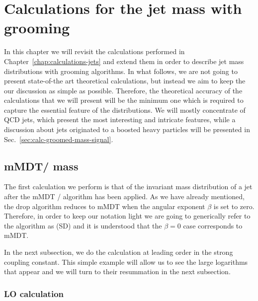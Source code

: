 %

\chapter{Calculations for the jet mass with grooming}\label{calculations-substructure-mass}

In this chapter we will revisit the calculations performed in Chapter~\ref{chap:calculations-jets} and extend them 
in order to describe jet mass distributions with grooming algorithms. 
%
In what follows, we are not going to present state-of-the art theoretical calculations, but instead we aim to keep the 
our discussion as simple as possible. Therefore, the theoretical accuracy of the calculations that we will present will be the minimum one which is required to capture the essential feature of the distributions. 
%
We will mostly concentrate of QCD jets, which present the most interesting and intricate features, while a discussion about jets originated to a boosted heavy particles will be presented in Sec.~\ref{sec:calc-groomed-mass-signal}.


\section{mMDT/ \SD mass}\label{sec:calc-groomed-mass}

The first calculation we perform is that of the invariant mass distribution of a jet after the mMDT / \SD algorithm
has been applied. As we have already mentioned, the \SD drop algorithm reduces to mMDT when the angular exponent
$\beta$ is set to zero. Therefore, in order to keep our notation light we are going to generically refer to the algorithm as \SD (SD) and it is understood that the $\beta=0$ case corresponds to mMDT.

In the next subsection, we do the calculation at leading order in the
strong coupling constant. This simple example will allow us to see the
large logarithms that appear and we will turn to their resummation in
the next subsection.

\subsection{LO calculation}\label{sec:calc-groomed-mass-LO}

